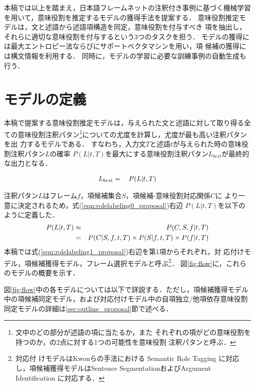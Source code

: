 \documentclass[japanese]{jnlp_1.2b}
\begin{document}
本稿では以上を踏まえ，日本語フレームネットの注釈付き事例に基づく機械学習
を用いて，意味役割を推定するモデルの獲得手法を提案する．
意味役割推定モデルは，文と述語から述語項構造を同定，意味役割を付与すべき
項を抽出し，それらに適切な意味役割を付与するという3つのタスクを担う．
モデルの獲得には最大エントロピー法ならびにサポートベクタマシンを用い，項
候補の獲得には構文情報を利用する．
同時に，モデルの学習に必要な訓練事例の自動生成も行う．




\section{モデルの定義}\label{sec:models_def_proposal}

本稿で提案する意味役割推定モデルは，与えられた文と述語に対して取り得る全
ての意味役割注釈パタン\footnote{文中のどの部分が述語の項に当たるか，また
それぞれの項がどの意味役割を持つのか，の2点に対する1つの可能性を意味役割
注釈パタンと呼ぶ．}についての尤度を計算し，尤度が最も高い注釈パタンを出
力するモデルである．
すなわち，入力文$T$と述語$t$が与えられた時の意味役割注釈パタン$L$の確率
$P(L|t,T)$を最大にする意味役割注釈パタン$L_{best}$が最終的な出力となる．

\begin{eqnarray}
 \label{eqn:rolelabeling0_proposal}
  L_{best} & = & \argmax{L} \: P(L|t,T)
\end{eqnarray}

注釈パタン$L$はフレーム$f$，項候補集合$S$，項候補-意味役割対応関係$C$に
より一意に決定されるため，式(\ref{eqn:rolelabeling0_proposal})右辺
$P(L|t,T)$を以下のように定義した．
\begin{eqnarray}
  P(L|t,T) & \approx & P(C,S,f|t,T) \nonumber\\\vspace*{-2mm}
 \label{eqn:rolelabeling1_proposal}
           & = & P(C|S,f,t,T) \times P(S|f,t,T) \times P(f|t,T)
\end{eqnarray}
本稿では式(\ref{eqn:rolelabeling1_proposal})右辺を第1項からそれぞれ，対
応付けモデル，項候補獲得モデル，フレーム選択モデルと呼ぶ\footnote{対応付
けモデルはKwonらの手法\cite{kwon04}における Semantic Role Tagging に対応
し，項候補獲得モデルはSentence SegmentationおよびArgument Identification
に対応する．}．
図\ref{fig:flow}に，これらのモデルの概要を示す．

図\ref{fig:flow}中の各モデルについては以下で詳説する．ただし，項候補獲得モデル中の項候補同定モデル，および対応付けモデル中の自項独立/他項依存意味役割同定モデルの詳細は\ref{sec:outline_proposal}節で述べる．
\end{document}
